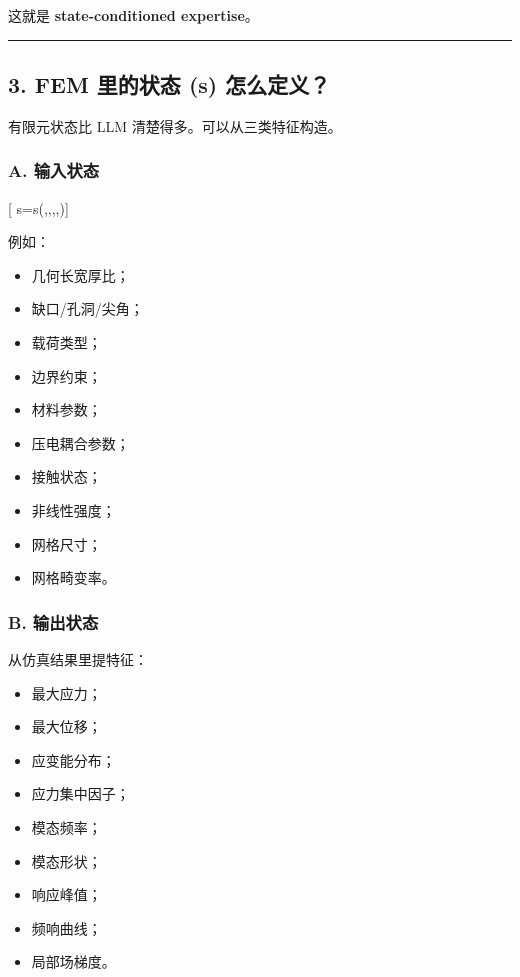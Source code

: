 \documentclass[
  12pt,
]{ctexart}
\providecommand{\tightlist}{%
  \setlength{\itemsep}{0pt}\setlength{\parskip}{0pt}}
\begin{document}
这就是 \textbf{state-conditioned expertise}。

\begin{center}\rule{0.5\linewidth}{0.5pt}\end{center}

\subsection{3. FEM 里的状态 (s)
怎么定义？}\label{fem-ux91ccux7684ux72b6ux6001-s-ux600eux4e48ux5b9aux4e49}

有限元状态比 LLM 清楚得多。可以从三类特征构造。

\subsubsection{A. 输入状态}\label{a.-ux8f93ux5165ux72b6ux6001}

{[} s=s(\Omega,,,\theta,){]}

例如：

\begin{itemize}
\tightlist
\item
  几何长宽厚比；
\item
  缺口/孔洞/尖角；
\item
  载荷类型；
\item
  边界约束；
\item
  材料参数；
\item
  压电耦合参数；
\item
  接触状态；
\item
  非线性强度；
\item
  网格尺寸；
\item
  网格畸变率。
\end{itemize}

\subsubsection{B. 输出状态}\label{b.-ux8f93ux51faux72b6ux6001}

从仿真结果里提特征：

\begin{itemize}
\tightlist
\item
  最大应力；
\item
  最大位移；
\item
  应变能分布；
\item
  应力集中因子；
\item
  模态频率；
\item
  模态形状；
\item
  响应峰值；
\item
  频响曲线；
\item
  局部场梯度。
\end{itemize}
\end{document}
